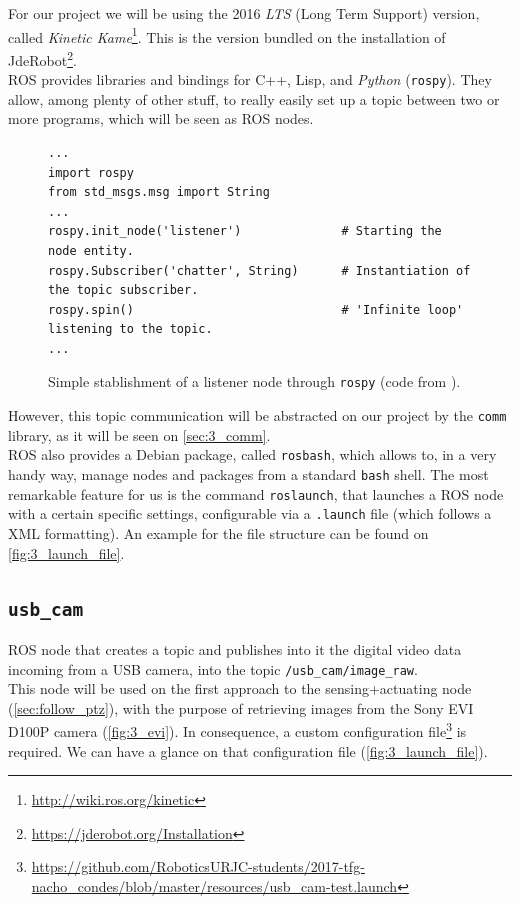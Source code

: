 	For our project we will be using the 2016 \textit{LTS} (Long Term Support) version, called \textit{Kinetic Kame}\footnote{\url{http://wiki.ros.org/kinetic}}. This is the version bundled on the installation of JdeRobot\footnote{\url{https://jderobot.org/Installation}}.\\
	
	ROS provides libraries and bindings for C++, Lisp, and \textit{Python} (\texttt{rospy}). They allow, among plenty of other stuff, to really easily set up a topic between two or more programs, which will be seen as ROS nodes.\\
	\begin{figure}[h]
		\begin{lstlisting}
...
import rospy
from std_msgs.msg import String
...
rospy.init_node('listener')              # Starting the node entity.
rospy.Subscriber('chatter', String)      # Instantiation of the topic subscriber.
rospy.spin()                             # 'Infinite loop' listening to the topic.
...
		\end{lstlisting}
		\caption{Simple stablishment of a listener node through \texttt{rospy} (code from \cite{listener-rospy}).}
		\label{fig:3_rospy_listener}
	\end{figure}
	
	However, this topic communication will be abstracted on our project by the \texttt{comm} library, as it will be seen on \autoref{sec:3_comm}.\\
	
	ROS also provides a Debian package, called \texttt{rosbash}, which allows to, in a very handy way, manage nodes and packages from a standard \texttt{bash} shell. The most remarkable feature for us is the command \texttt{roslaunch}, that launches a ROS node with a certain specific settings, configurable via a \texttt{.launch} file (which follows a XML formatting). An example for the file structure can be found on \autoref{fig:3_launch_file}.\\
	
	\subsection{\texttt{usb\_cam}}
	\label{sec:3_usb_cam}
		ROS node that creates a topic and publishes into it the digital video data incoming from a USB camera, into the topic \texttt{/usb\_cam/image\_raw}.\\
		
		This node will be used on the first approach to the sensing+actuating node (\autoref{sec:follow_ptz}), with the purpose of retrieving images from the Sony EVI D100P camera (\autoref{fig:3_evi}). In consequence, a custom configuration file\footnote{\url{https://github.com/RoboticsURJC-students/2017-tfg-nacho\_condes/blob/master/resources/usb\_cam-test.launch}} is required. We can have a glance on that configuration file (\autoref{fig:3_launch_file}).\\
		
